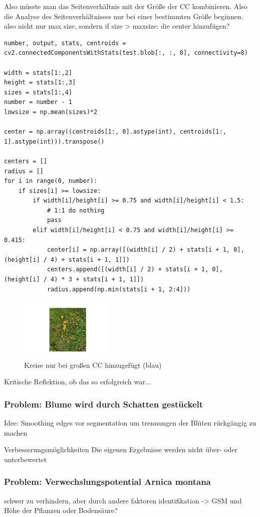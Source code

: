 Also müsste man das Seitenverhältnis mit der Größe der CC kombinieren. Also die Analyse des Seitenverhältnisses nur bei einer bestimmten Größe beginnen. 
also nicht nur max size, sondern if size > maxsize: die center hinzufügen?

\blindtext
\lstset{language=python}
\begin{lstlisting}[frame=htrbl, caption={Das Listing zeigt Python Quellcode}, label={lst:result2}]
number, output, stats, centroids = cv2.connectedComponentsWithStats(test.blob[:, :, 0], connectivity=8)

width = stats[1:,2]
height = stats[1:,3]
sizes = stats[1:,4]
number = number - 1
lowsize = np.mean(sizes)*2

center = np.array((centroids[1:, 0].astype(int), centroids[1:, 1].astype(int))).transpose()

centers = []
radius = []
for i in range(0, number):
    if sizes[i] >= lowsize:
        if width[i]/height[i] >= 0.75 and width[i]/height[i] < 1.5:
            # 1:1 do nothing
            pass
        elif width[i]/height[i] < 0.75 and width[i]/height[i] >= 0.415:
            center[i] = np.array([(width[i] / 2) + stats[i + 1, 0], (height[i] / 4) + stats[i + 1, 1]])
            centers.append([(width[i] / 2) + stats[i + 1, 0], (height[i] / 4) * 3 + stats[i + 1, 1]])
            radius.append(np.min(stats[i + 1, 2:4]))
\end{lstlisting}

\begin{figure}[htb]
 \centering
 \includegraphics[width=0.4\textwidth,angle=0]{abb/ergebnisse/probleme/circles-adjust}
 \caption{Kreise nur bei großen CC hinzugefügt (blau)}
\label{fig:Kreis-blau2}
\end{figure}

Kritische Reflektion, ob das so erfolgreich war...

\subsubsection{Problem: Blume wird durch Schatten gestückelt}

Idee: Smoothing edges vor segmentation um trennungen der Blüten rückgängig zu machen


Verbesserungsmöglichkeiten
Die eigenen Ergebnisse werden nicht über- oder unterbewertet

\subsubsection{Problem: Verwechslungspotential Arnica montana}

 schwer zu verhindern, aber durch andere faktoren identifikation -> GSM und Höhe der Pflanzen oder Bodensäure?

